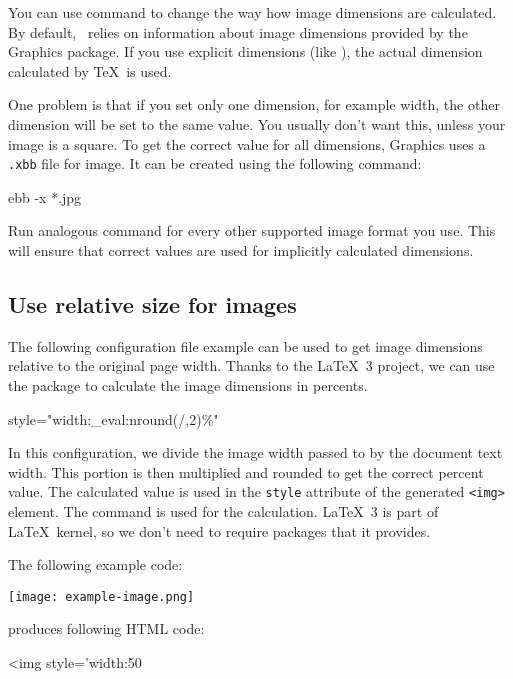 You can use  command to change the way how image dimensions
are calculated. By default, \texfourht\ relies on information about image
dimensions provided by the Graphics package. If you use explicit dimensions
(like ), the actual dimension calculated by \TeX\ is used.

One problem is that if you set only one dimension, for example width, the other
dimension will be set to the same value. You usually don't want this, unless
your image is a square. To get the correct value for all dimensions, Graphics
uses a \verb|.xbb| file for image. It can be created using the following command:

\begin{shellcommand}
ebb -x *.jpg
\end{shellcommand}

Run analogous command for every other supported image format you use. This will
ensure that correct values are used for implicitly calculated dimensions.

\subsection{Use relative size for images}

The following configuration file example can be used to get image dimensions
relative to the original page width. Thanks to the \LaTeX\ 3 project, we can 
use the  package to calculate the image dimensions in percents. 

\begin{texsource}
\makeatletter
\ExplSyntaxOn
{}
{style="width:\fp_eval:n{round(\Gin@req@width/,2)}\%"}
\ExplSyntaxOff
\makeatother

\EndPreamble
\end{texsource}

In this configuration, we divide the image width passed to
 by the document text width. 
This portion is then multiplied and rounded to get the correct percent value.
The calculated value is used in the \verb|style| attribute of the generated \verb|<img>| element.
The  command  is used for the calculation. 
\LaTeX\ 3 is part of \LaTeX\ kernel, so we don't need to require packages that it provides.

The following example code:

\begin{texsource}
\texttt{[image: example-image.png]}
\end{texsource}

produces following HTML code:

\begin{htmlsource}
<img style='width:50%
\end{htmlsource}

